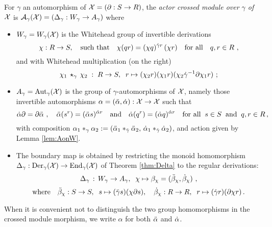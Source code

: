 \begin{defn} 
For $\gamma$ an automorphism of $\mathcal{X} = (\partial : S \to R)$, 
the \emph{actor crossed module over $\gamma$ of $\mathcal{X}$} is 
$\mathcal{A}_{\gamma}(\mathcal{X}) = (\Delta_{\gamma} : W_{\gamma} \to A_{\gamma})$  
where  
\begin{itemize}
\item
$W_{\gamma} = W_{\gamma}(\mathcal{X})$  
is the Whitehead group of invertible derivations
\begin{equation} \label{eq:der-rule}
\chi : R \to S, \quad \mbox{such that} \quad
\chi(qr) = (\chi q)^{\dot{\gamma} r}\,(\chi r)
\quad\mbox{for all}\quad
q,r \in R~,
\end{equation}
and with Whitehead multiplication (on the right)
\begin{equation} \label{eq:W-mult}
\chi_1 \,\star_{\gamma}\, \chi_2 \;:\; R \to S, \;\;
r \mapsto (\chi_2 r)(\chi_1 r)(\chi_2\dot{\gamma}^{-1}\partial\chi_1 r)~;
\end{equation}
\item
$A_{\gamma} = \mathrm{Aut}_{\gamma}(\mathcal{X})$  is the group of $\gamma$-automorphisms of  $\mathcal{X}$,
namely those invertible  automorphisms $\alpha = (\ddot{\alpha},\dot{\alpha}) : \mathcal{X} \to \mathcal{X}$  such that
$$
\dot{\alpha} \partial = \partial \ddot{\alpha}~, \quad
\ddot{\alpha}(s^r) = (\ddot{\alpha} s)^{\dot{\alpha} r}
\quad \mbox{and} \quad
\dot{\alpha}(q^r) = (\dot{\alpha} q)^{\dot{\alpha} r}
\quad \mbox{for all} \;\;
s \in S \;\; \mbox{and} \;\; q,r \in R\,, 
$$ 
with composition \quad 
$\alpha_1 \ast_{\gamma} \alpha_2 
:= (\ddot{\alpha}_1 \ast_{\ddot{\gamma}} \ddot{\alpha}_2,\, \dot{\alpha}_1 \ast_{\dot{\gamma}} \dot{\alpha}_2)$, 
and action given by Lemma \ref{lem:AonW}. 
\item 
The boundary map is obtained by restricting the monoid homomorphism 
$\Delta_{\gamma} : \mathrm{Der}_{\gamma}(\mathcal{X}) \to \mathrm{End}_{\gamma}(\mathcal{X})$  
of Theorem \ref{thm:Delta} to the regular derivations: 
$$
\Delta_{\gamma} \,:\, W_{\gamma} \to A_{\gamma}, \;\; \chi \mapsto 
   \beta_{\chi} = (\ddot{\beta}_{\chi}, \dot{\beta}_{\chi})~,
$$
\begin{equation} \label{eq:actor-bdy}
\mbox{where} \quad
\ddot{\beta}_{\chi} : S \to S, \;\; s \mapsto (\ddot{\gamma} s)(\chi \partial s), \quad
  \dot{\beta}_{\chi} : R \to R, \;\; r \mapsto (\dot{\gamma} r)(\partial \chi r)\,.
\end{equation}
\end{itemize}
\end{defn}

When it is convenient not to distinguish the two group homomorphisms
in the crossed module morphism,
we write  $\alpha$  for both  $\ddot{\alpha}$  and  $\dot{\alpha}$.


